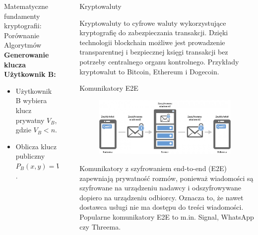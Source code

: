 \documentclass[final]{beamer}
\newlength{\sepwidth}
\newlength{\colwidth}
\newcommand{\separatorcolumn}{\begin{column}{\sepwidth}\end{column}}
\begin{document}
\begin{frame}[t]
\begin{columns}[t]
\begin{column}{\colwidth}
\begin{block}{Matematyczne fundamenty kryptografii: Porównanie Algorytmów}
    \textbf{Generowanie klucza Użytkownik B:}
    \begin{itemize}
        \item Użytkownik B wybiera klucz prywatny $V_B$, gdzie $V_B < n$.
        \item Oblicza klucz publiczny $P_B(x, y) = V_B \times G(x, y)$.
    \end{itemize}

 

  \end{block}
\end{column}

\separatorcolumn

\begin{column}{\colwidth}  

\begin{block}{Kryptowaluty}
    
Kryptowaluty to cyfrowe waluty wykorzystujące kryptografię do zabezpieczania transakcji. Dzięki technologii blockchain możliwe jest prowadzenie transparentnej i bezpiecznej księgi transakcji bez potrzeby centralnego organu kontrolnego. Przykłady kryptowalut to Bitcoin, Ethereum i Dogecoin.
\end{block}

  \begin{alertblock}{Komunikatory E2E}
    \begin{figure}
    \centering
    \includegraphics[width=0.975\textwidth]{logos/images/szyfrowanie-end-to-end.jpg}
    \label{fig:e2e}
    \end{figure}
Komunikatory z szyfrowaniem end-to-end (E2E) zapewniają prywatność rozmów, ponieważ wiadomości są szyfrowane na urządzeniu nadawcy i odszyfrowywane dopiero na urządzeniu odbiorcy. Oznacza to, że nawet dostawca usługi nie ma dostępu do treści wiadomości. Popularne komunikatory E2E to m.in. Signal, WhatsApp czy Threema.
\end{alertblock}


\end{column}
\end{columns}
\end{frame}
\end{document}
